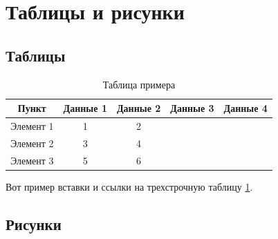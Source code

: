 \section{Таблицы и рисунки}

\subsection{Таблицы}

\begin{table}[htbp]
\centering
\caption{Таблица примера}
\label{tab:t1}
\begin{tabular}{ccccc}
\toprule
Пункт & Данные 1 & Данные 2 & Данные 3 & Данные 4 \\
\midrule
	Элемент 1 & 1 & 2 \\
	Элемент 2 & 3 & 4 \\
	Элемент 3 & 5 & 6 \\
\bottomrule
\end{tabular}
\end{table}

Вот пример вставки и ссылки на трехстрочную таблицу \ref{tab:t1}.

\subsection{Рисунки}

